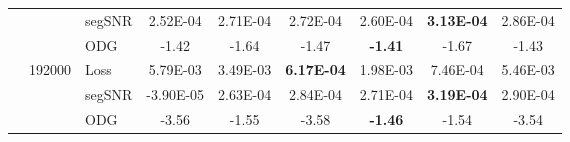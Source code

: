 {\begin{tabular}{@{}l|c|l|c|c|c|c|c|c|@{}}
        \multicolumn{1}{|l|}{} &  & segSNR  & 2.52E-04              & 2.71E-04          & 2.72E-04 & 2.60E-04 & \textbf{3.13E-04} & 2.86E-04 \\ \cmidrule(l){3-9} 
        \multicolumn{1}{|l|}{} &  & ODG     & -1.42                 & -1.64             & -1.47 & \textbf{-1.41} & -1.67 & -1.43 \\ \cmidrule(l){2-9} 
        \multicolumn{1}{|l|}{} & \multirow{3}{*}{192000} & 
                                    Loss    & 5.79E-03              & 3.49E-03          & \textbf{6.17E-04} & 1.98E-03 & 7.46E-04 & 5.46E-03 \\ \cmidrule(l){3-9} 
        \multicolumn{1}{|l|}{} &  & segSNR  & -3.90E-05             & 2.63E-04          & 2.84E-04 & 2.71E-04 & \textbf{3.19E-04} & 2.90E-04 \\ \cmidrule(l){3-9} 
        \multicolumn{1}{|l|}{} &  & ODG     & -3.56                 & -1.55             & -3.58 & \textbf{-1.46} & -1.54 & -3.54 \\ \bottomrule
    \end{tabular}%
    }